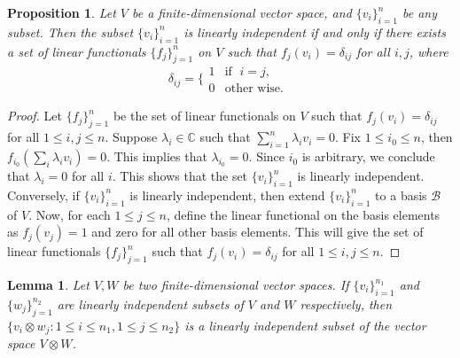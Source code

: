 \documentclass[10pt,reqno]{amsart}
\theoremstyle{definition}
\theoremstyle{plain}
\newtheorem{lem}[defn]{Lemma}
\newtheorem{prop}[defn]{Proposition}
\theoremstyle{remark}
\newcommand{\mbb}[1]{\mathbb{#1}}
\newcommand{\msc}[1]{\mathscr{#1}}
\numberwithin{equation}{section}%
\begin{document}
   
   \begin{prop}\label{prop-LI-functionals}
   	Let $V$ be a finite-dimensional vector space, and $\{v_i\}_{i=1}^n$ be any subset. Then the subset $\{v_i\}_{i=1}^n$ is linearly independent if and only if there exists a set of linear functionals $\{f_j\}_{j=1}^n$ on $V$ such that $f_j(v_i)=\delta_{ij}$ for all $ i,j$, where $$\delta_{ij}=\Big\{\begin{array}{cc}
   		1  & \mbox{if } \; i=j,  \\
   		0 & \mbox{other wise. }
   	\end{array}$$
   \end{prop}
   
   
   
   \begin{proof}
   	Let $\{f_j\}_{j=1}^n$ be the set of linear functionals on $V$ such that $f_j(v_i)=\delta_{ij}$ for all $1\leq i,j\leq n$.  Suppose $\lambda_i\in\mbb{C}$ such that $\sum_{i=1}^n\lambda_iv_i=0$. Fix $1\leq i_0\leq n$, then $f_{i_0}(\sum_{i}\lambda_iv_i)=0$. This implies that $\lambda_{i_0}=0$. Since $i_0$ is arbitrary, we conclude that $\lambda_i=0$ for all $i$. This shows that the set $\{v_i\}_{i=1}^n$ is linearly independent. Conversely, if $\{v_i\}_{i=1}^n$ is linearly independent, then extend $\{v_i\}_{i=1}^n$ to a basis $\msc{B}$ of $V$. Now, for each $1\leq j\leq n$, define the linear functional on the basis elements as $f_j(v_j)=1$ and zero for all other basis elements. This will give the set of linear functionals $\{f_j\}_{j=1}^n$ such that $f_j(v_i)=\delta_{ij}$ for all $1\leq i,j\leq n$.
   \end{proof}
   
   
   \begin{lem}\label{lem-tensor-LI}
   	Let $V, W$ be two finite-dimensional vector spaces. If $\{v_i\}_{i=1}^{n_1}$ and $\{w_j\}_{j=1}^{n_2}$ are linearly independent subsets of $V$ and $W$ respectively, then $\{v_i\otimes w_j: 1\leq i\leq n_1, 1\leq j\leq n_2\}$ is a linearly independent subset of the vector space $V\otimes W$.
   \end{lem}
   
   
   
\end{document}
